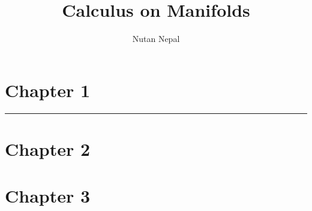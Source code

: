 
\title{Calculus on Manifolds}
\author{Nutan Nepal}



\maketitle 
    \section*{Chapter 1}
        
        
        
        \begin{questions}
            
            
            
            
            
        \end{questions}
        \hrule
    \section*{Chapter 2}
        \begin{questions}
            
            
            
            
        
            
            
            
            
            
            
            
            
            
            
            
            
            
        \end{questions}
    \section*{Chapter 3}
        \begin{questions}
            
            
            
            
            
            
            
            
        \end{questions}

